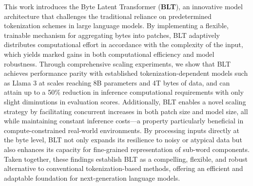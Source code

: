 This work introduces the Byte Latent Transformer (\textbf{BLT}), an innovative model architecture that challenges the traditional reliance on predetermined tokenization schemes in large language models. By implementing a flexible, trainable mechanism for aggregating bytes into patches, {\textsc BLT} adaptively distributes computational effort in accordance with the complexity of the input, which yields marked gains in both computational efficiency and model robustness. Through comprehensive scaling experiments, we show that {\textsc BLT} achieves performance parity with established tokenization-dependent models such as Llama 3 at scales reaching 8B parameters and 4T bytes of data, and can attain up to a 50\% reduction in inference computational requirements with only slight diminutions in evaluation scores. Additionally, {\textsc BLT} enables a novel scaling strategy by facilitating concurrent increases in both patch size and model size, all while maintaining constant inference costs—a property particularly beneficial in compute-constrained real-world environments. By processing inputs directly at the byte level, {\textsc BLT} not only expands its resilience to noisy or atypical data but also enhances its capacity for fine-grained representation of sub-word components. Taken together, these findings establish {\textsc BLT} as a compelling, flexible, and robust alternative to conventional tokenization-based methods, offering an efficient and adaptable foundation for next-generation language models.

